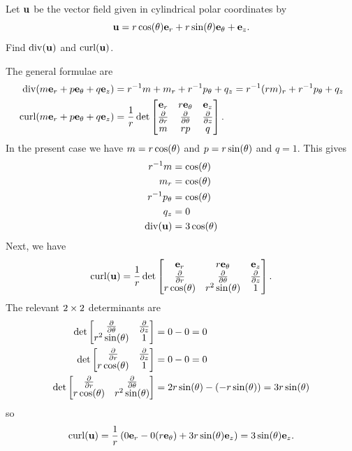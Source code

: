 \documentclass[a4paper]{amsart}
\renewenvironment{solution}{\SolutionInline}{\endSolutionInline}
\begin{document}
\begin{exercise}
 Let $\mathbf{u}$ be the vector field given in cylindrical polar coordinates
 by 
 \[ \mathbf{u} = r\cos(\theta) \mathbf{e}_r + r\sin(\theta)\mathbf{e}_\theta + \mathbf{e}_z. \]
 Find $\operatorname{div}(\mathbf{u})$ and $\operatorname{curl}(\mathbf{u})$.
\end{exercise}
\begin{solution}
 The general formulae are
 \begin{align*}
  \operatorname{div}(m\mathbf{e}_r+p\mathbf{e}_\theta+q\mathbf{e}_z)
   &= r^{-1}m + m_r + r^{-1}p_\theta + q_z 
    = r^{-1}(rm)_r + r^{-1}p_\theta + q_z \\
  \operatorname{curl}(m\mathbf{e}_r+p\mathbf{e}_\theta+q\mathbf{e}_z)
   &= \frac{1}{r} \det\left[\begin{matrix}
        \mathbf{e}_r & r\mathbf{e}_\theta & \mathbf{e}_z \\
        \frac{\partial}{\partial r}  & \frac{\partial}{\partial\theta}      & \frac{\partial}{\partial z}  \\
        m     & rp        & q \end{matrix}\right].
 \end{align*}
 In the present case we have $m=r\cos(\theta)$ and $p=r\sin(\theta)$ and
 $q=1$.  This gives
 \begin{align*}
  r^{-1}m &= \cos(\theta) \\
  m_r &= \cos(\theta) \\
  r^{-1}p_\theta &= \cos(\theta) \\
  q_z &= 0 \\
  \operatorname{div}(\mathbf{u}) &= 3\cos(\theta) 
 \end{align*}
 Next, we have 
 \[ \operatorname{curl}(\mathbf{u}) = 
       \frac{1}{r} \det\left[\begin{matrix}
         \mathbf{e}_r & r\mathbf{e}_\theta & \mathbf{e}_z \\
         \frac{\partial}{\partial r}  & \frac{\partial}{\partial\theta}      & \frac{\partial}{\partial z}  \\
         r\cos(\theta) & r^2\sin(\theta) & 1 \end{matrix}\right].
 \]
 The relevant $2\times 2$ determinants are
 \begin{align*}
  \det\left[\begin{matrix} \frac{\partial}{\partial\theta} & \frac{\partial}{\partial z} \\ r^2\sin(\theta) & 1 \end{matrix}\right] 
   &= 0-0 = 0 \\
  \det\left[\begin{matrix} \frac{\partial}{\partial r} & \frac{\partial}{\partial z} \\ r\cos(\theta) & 1 \end{matrix}\right] 
   &= 0-0 = 0 \\
  \det\left[\begin{matrix} \frac{\partial}{\partial r} & \frac{\partial}{\partial\theta} \\ r\cos(\theta) & r^2\sin(\theta) \end{matrix}\right] 
   &= 2r\sin(\theta)-(-r\sin(\theta)) = 3r\sin(\theta)
 \end{align*}
 so 
 \[ \operatorname{curl}(\mathbf{u}) = 
     \frac{1}{r}\left(
      0\mathbf{e}_r - 0(r\mathbf{e}_\theta) + 3r\sin(\theta)\mathbf{e}_z
     \right) = 3\sin(\theta)\mathbf{e}_z.
 \] 
\end{solution}
\end{document}
